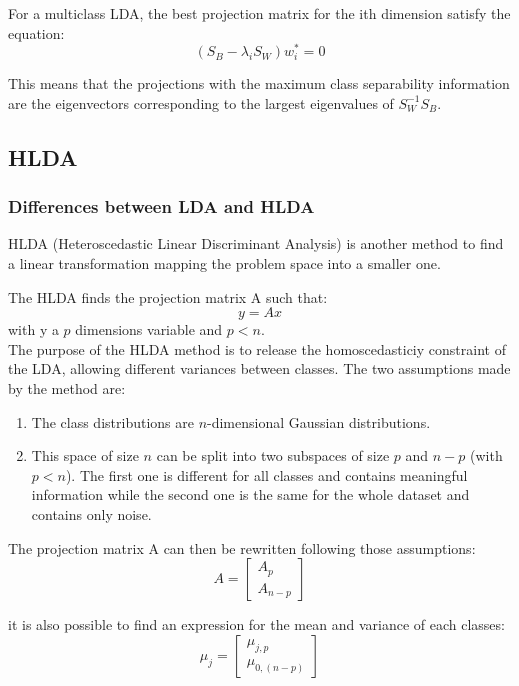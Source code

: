 For a multiclass LDA, the best projection matrix for the ith dimension satisfy the equation:
$$(S_B - \lambda_i S_W)w_{i}^* = 0$$

This means that the projections with the maximum class separability information are the eigenvectors corresponding to the largest eigenvalues of $S_{W}^{-1} S_B$.

\subsection{HLDA}

\subsubsection{Differences between LDA and HLDA}

HLDA (Heteroscedastic Linear Discriminant Analysis) is another method to find a linear transformation mapping the problem space into a smaller one.

The HLDA finds the projection matrix A such that:
$$y = Ax$$
with y a $p$ dimensions variable and $p < n$.\\

The purpose of the HLDA method is to release the homoscedasticiy constraint of the LDA, allowing different variances between classes. The two assumptions made by the method are:

\begin{enumerate}
  \item The class distributions are $n$-dimensional Gaussian distributions.
  \item This space of size $n$ can be split into two subspaces of size $p$
    and $n - p$ (with $p < n$). The first one is different for all classes and contains meaningful information while the second one is the same for the whole dataset and contains only noise.
\end{enumerate}

The projection matrix A can then be rewritten following those assumptions:
$$A = \left [
  \begin{array}{c}
    A_p\\
    A_{n-p}
  \end{array}
\right ]
$$

it is also possible to find an expression for the mean and variance of each classes:
$$\mu_j =
\left [
  \begin{array}{c}
    \mu_{j,p}\\
    \mu_{0,(n-p)}
  \end{array}
\right ]
$$

